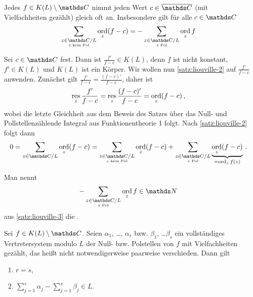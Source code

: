 \begin{satz}\label{satz:liouville-3}
Jedes $f \in K(L)\setminus\CC$ nimmt jeden Wert $c\in\closure\CC$ (mit Vielfachheiten gezählt) gleich oft an.
Insbesondere gilt für alle $c\in\CC$
\[
	\sum_{\substack{z\in\CC/L\\ \scriptscriptstyle z \text{ kein Pol}}} \ord_z(f-c)
	= -\sum_{\substack{z\in\CC/L\\ \scriptscriptstyle z \text{ Pol}}} \ord_z f
\]
\end{satz}

\begin{bewe}
Sei $c\in\CC$ fest.
Dann ist $\frac{f'}{f-c} \in K(L)$, denn $f$ ist nicht konstant, $f'\in K(L)$ und $K(L)$ ist ein Körper.
Wir wollen nun \autoref{satz:liouville-2} auf $\frac{f'}{f-c}$ anwenden.
Zunächst gilt $\frac{f'}{f-c} = \frac{(f-c)'}{f-c}$, daher ist 
\[
	\operatorname*{res}_z \frac{f'}{f-c}
	= \operatorname*{res}_z \frac{(f-c)'}{f-c}
	= \operatorname*{ord}_z (f-c)
	\,,
\]
wobei die letzte Gleichheit aus dem Beweis des Satzes über das Null- und Pollstellenzählende Integral aus Funktionentheorie 1 folgt.
Nach \autoref{satz:liouville-2} folgt dann
\[
	0
	= \sum_{z\in\CC/L} \ord_z (f-c)
	= \sum_{\substack{z\in\CC/L\\ \scriptscriptstyle z \text{ kein Pol}}} \ord_z (f-c)
	+ \sum_{\substack{z\in\CC/L\\ \scriptscriptstyle z \text{ Pol}}} \underbrace{\ord_z (f-c)}_{=\ord_z f(z)}
	\,.
\]
\end{bewe}

\begin{defi}
Man nennt
\[
	-\sum_{\substack{z\in\CC/L\\ \scriptscriptstyle z \text{ Pol}}} \ord_z f \in \NN
\]
aus \autoref{satz:liouville-3} die .
\end{defi}

\begin{satz}\label{satz:liouville-4}
Sei $f\in K(L)\setminus\CC$.
Seien $\alpha_1$, \ldots, $\alpha_r$ bzw. $\beta_1$, \ldots $\beta_s$ ein vollständiges Vertretersystem modulo $L$ der Null- bzw. Polstellen von $f$ mit Vielfachheiten gezählt, das heißt nicht notwendigerweise paarweise verschieden.
Dann gilt
\begin{enumerate}
\item $r = s$,
\item $\sum_{j=1}^s \alpha_j - \sum_{j=1}^s \beta_j \in L$.
\end{enumerate}
\end{satz}

